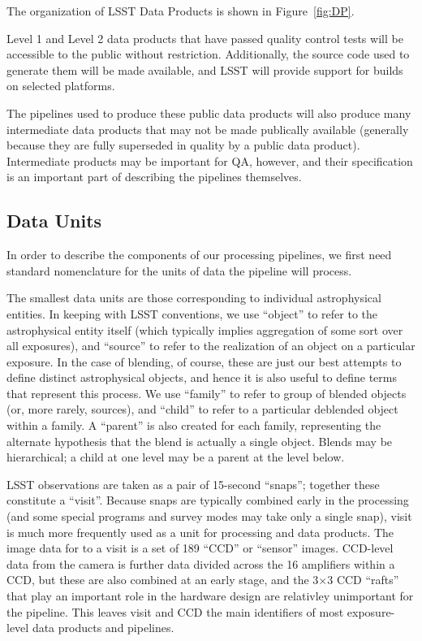 The organization of LSST Data Products is shown in Figure~\ref{fig:DP}.

Level 1 and Level 2 data products that have passed quality control
tests will be accessible to the public without restriction.
Additionally, the source code used to generate them will be made
available, and LSST will provide support for builds on selected
platforms.

The pipelines used to produce these public data products will also produce many intermediate data products that may not be made publically available (generally because they are fully superseded in quality by a public data product).  Intermediate products may be important for QA, however, and their specification is an important part of describing the pipelines themselves.

\subsection{Data Units}
\label{sec:introDataUnits}

In order to describe the components of our processing pipelines, we first need standard nomenclature for the units of data the pipeline will process.

The smallest data units are those corresponding to individual astrophysical entities.  In keeping with LSST conventions, we use ``object'' to refer to the astrophysical entity itself (which typically implies aggregation of some sort over all exposures), and ``source'' to refer to the realization of an object on a particular exposure.  In the case of blending, of course, these are just our best attempts to define distinct astrophysical objects, and hence it is also useful to define terms that represent this process.  We use ``family'' to refer to group of blended objects (or, more rarely, sources), and ``child'' to refer to a particular deblended object within a family.  A ``parent'' is also created for each family, representing the alternate hypothesis that the blend is actually a single object.  Blends may be hierarchical; a child at one level may be a parent at the level below.

LSST observations are taken as a pair of 15-second ``snaps''; together these constitute a ``visit''.  Because snaps are typically combined early in the processing (and some special programs and survey modes may take only a single snap), visit is much more frequently used as a unit for processing and data products.  The image data for to a visit is a set of 189 ``CCD'' or ``sensor'' images.  CCD-level data from the camera is further data divided across the 16 amplifiers within a CCD, but these are also combined at an early stage, and the 3$\times$3 CCD ``rafts'' that play an important role in the hardware design are relativley unimportant for the pipeline.  This leaves visit and CCD the main identifiers of most exposure-level data products and pipelines.

